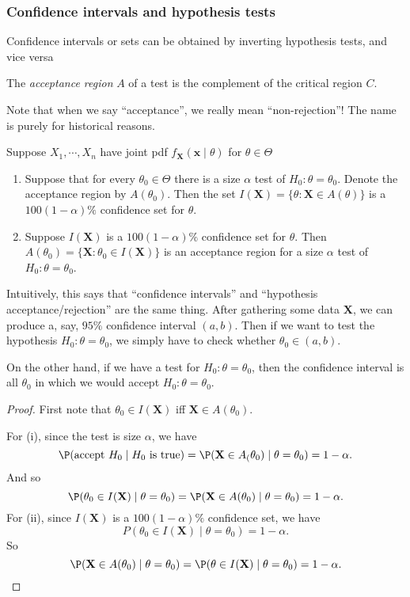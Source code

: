 \documentclass[a4paper]{article}
\begin{document}
\subsubsection{Confidence intervals and hypothesis tests}
Confidence intervals or sets can be obtained by inverting hypothesis tests, and vice versa

\begin{defi}
  The \emph{acceptance region} $A$ of a test is the complement of the critical region $C$.

  Note that when we say ``acceptance'', we really mean ``non-rejection''! The name is purely for historical reasons.
\end{defi}
Suppose $X_1, \cdots, X_n$ have joint pdf $f_\mathbf{X}(\mathbf{x}\mid \theta)$ for $\theta\in \Theta$

\begin{thm}\leavevmode
  \begin{enumerate}
    \item Suppose that for every $\theta_0\in \Theta$ there is a size $\alpha$ test of $H_0: \theta = \theta_0$. Denote the acceptance region by $A(\theta_0)$. Then the set $I(\mathbf{X}) = \{\theta:\mathbf{X}\in A(\theta)\}$ is a $100(1 - \alpha)\%$ confidence set for $\theta$.
    \item Suppose $I(\mathbf{X})$ is a $100(1 - \alpha)\%$ confidence set for $\theta$. Then $A(\theta_0) = \{\mathbf{X}: \theta_0 \in I(\mathbf{X})\}$ is an acceptance region for a size $\alpha$ test of $H_0: \theta = \theta_0$.
  \end{enumerate}
\end{thm}
Intuitively, this says that ``confidence intervals'' and ``hypothesis acceptance/rejection'' are the same thing. After gathering some data $\mathbf{X}$, we can produce a, say, $95\%$ confidence interval $(a, b)$. Then if we want to test the hypothesis $H_0: \theta = \theta_0$, we simply have to check whether $\theta_0 \in (a, b)$.

On the other hand, if we have a test for $H_0: \theta = \theta_0$, then the confidence interval is all $\theta_0$ in which we would accept $H_0: \theta = \theta_0$.
\begin{proof}
  First note that $\theta_0\in I(\mathbf{X})$ iff $\mathbf{X}\in A(\theta_0)$.

  For (i), since the test is size $\alpha$, we have
  \[
    \P(\text{accept }H_0\mid H_0\text{ is true}) = \P(\mathbf{X}\in A_(\theta_0)\mid \theta=\theta_0) = 1 - \alpha.
  \]
  And so
  \[
    \P(\theta_0\in I(\mathbf{X})\mid \theta = \theta_0) = \P(\mathbf{X}\in A(\theta_0)\mid \theta = \theta_0) = 1 - \alpha.
  \]
  For (ii), since $I(\mathbf{X})$ is a $100(1 - \alpha)\%$ confidence set, we have
  \[
    P(\theta_0\in I(\mathbf{X})\mid \theta = \theta_0) = 1- \alpha.
  \]
  So
  \[
    \P(\mathbf{X}\in A(\theta_0)\mid \theta = \theta_0) = \P(\theta\in I(\mathbf{X})\mid \theta = \theta_0) = 1- \alpha.\qedhere
  \]
\end{proof}
\end{document}
